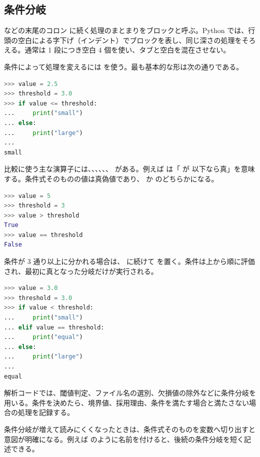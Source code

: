 \subsection{条件分岐}
\label{subsec:if}

 などの末尾のコロン \code{:} に続く処理のまとまりをブロックと呼ぶ。Python では、行頭の空白による字下げ（インデント）でブロックを表し、同じ深さの処理をそろえる。通常は 1 段につき空白 4 個を使い、タブと空白を混在させない。

条件によって処理を変えるには  を使う。最も基本的な形は次の通りである。

\begin{lstlisting}[language=Python, numbers=none, xleftmargin=2\zw]
>>> value = 2.5
>>> threshold = 3.0
>>> if value <= threshold:
...     print("small")
... else:
...     print("large")
...
small
\end{lstlisting}

比較に使う主な演算子には、\code{==}、\code{!=}、\code{<}、\code{<=}、\code{>}、\code{>=} がある。例えば  は「 が  以下なら真」を意味する。条件式そのものの値は真偽値であり、 か  のどちらかになる。
\begin{lstlisting}[language=Python, numbers=none, xleftmargin=2\zw]
>>> value = 5
>>> threshold = 3
>>> value > threshold
True
>>> value == threshold
False
\end{lstlisting}

条件が 3 通り以上に分かれる場合は、 に続けて  を置く。条件は上から順に評価され、最初に真となった分岐だけが実行される。

\begin{lstlisting}[language=Python, numbers=none, xleftmargin=2\zw]
>>> value = 3.0
>>> threshold = 3.0
>>> if value < threshold:
...     print("small")
... elif value == threshold:
...     print("equal")
... else:
...     print("large")
...
equal
\end{lstlisting}

解析コードでは、閾値判定、ファイル名の選別、欠損値の除外などに条件分岐を用いる。条件を決めたら、境界値、採用理由、条件を満たす場合と満たさない場合の処理を記録する。

条件分岐が増えて読みにくくなったときは、条件式そのものを変数へ切り出すと意図が明確になる。例えば  のように名前を付けると、後続の条件分岐を短く記述できる。

